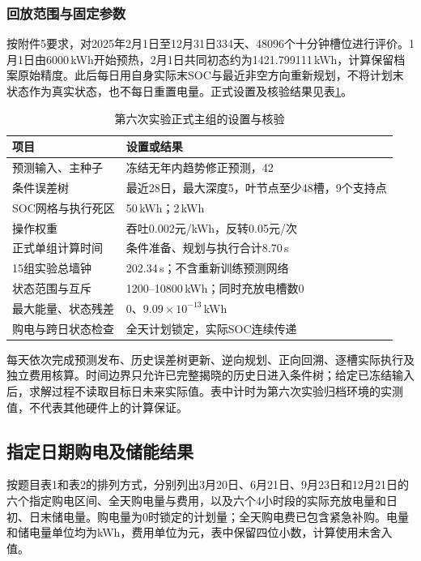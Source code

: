 \subsubsection{回放范围与固定参数}

按附件5要求，对2025年2月1日至12月31日334天、48096个十分钟槽位进行评价。1月1日由6000\,kWh开始预热，2月1日共同初态约为1421.799111\,kWh，计算保留档案原始精度。此后每日用自身实际末SOC与最近非空方向重新规划，不将计划末状态作为真实状态，也不每日重置电量。正式设置及核验结果见表\ref{tab:q2-setup}。

\begin{table}[htbp]
\centering\small
\caption{第六次实验正式主组的设置与核验}\label{tab:q2-setup}
\renewcommand{\arraystretch}{1.12}
\begin{tabularx}{\textwidth}{p{4.4cm}X}
\toprule
项目 & 设置或结果\\
\midrule
预测输入、主种子 & 冻结无年内趋势修正预测，42\\
条件误差树 & 最近28日，最大深度5，叶节点至少48槽，9个支持点\\
SOC网格与执行死区 & 50\,kWh；2\,kWh\\
操作权重 & 吞吐0.002元/kWh，反转0.05元/次\\
正式单组计算时间 & 条件准备、规划与执行合计8.70\,s\\
15组实验总墙钟 & 202.34\,s；不含重新训练预测网络\\
状态范围与互斥 & 1200--10800\,kWh；同时充放电槽数0\\
最大能量、状态残差 & 0、$9.09\times10^{-13}$\,kWh\\
购电与跨日状态检查 & 全天计划锁定，实际SOC连续传递\\
\bottomrule
\end{tabularx}
\end{table}

每天依次完成预测发布、历史误差树更新、逆向规划、正向回溯、逐槽实际执行及独立费用核算。时间边界只允许已完整揭晓的历史日进入条件树；给定已冻结输入后，求解过程不读取目标日未来实际值。表中计时为第六次实验归档环境的实测值，不代表其他硬件上的计算保证。

\clearpage
\subsection{指定日期购电及储能结果}

按题目表1和表2的排列方式，分别列出3月20日、6月21日、9月23日和12月21日的六个指定购电区间、全天购电量与费用，以及六个4小时段的实际充放电量和日初、日末储电量。购电量为0时锁定的计划量；全天购电费已包含紧急补购。电量和储电量单位均为kWh，费用单位为元，表中保留四位小数，计算使用未舍入值。

